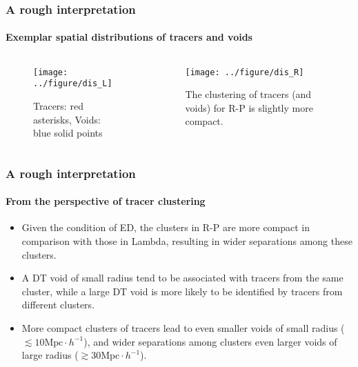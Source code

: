 \documentclass{beamer}
\newtheorem{Narrow down the analysis}{Narrow down the analysis}
\begin{document}
\begin{frame}
	\frametitle{A rough interpretation}
	\framesubtitle{Exemplar spatial distributions of tracers and voids}
	\begin{columns}
	\begin{column}{0.5\textwidth}
	\begin{figure}
\centering
\texttt{[image: ../figure/dis\_L]}
\caption{Tracers: red asterisks, Voids: blue solid points}
\label{29}
\end{figure}
	\end{column}
	\begin{column}{0.5\textwidth}
	\begin{figure}
\centering
\texttt{[image: ../figure/dis\_R]}
\caption{The clustering of tracers (and voids) for R-P is slightly more compact.}
\label{29}
\end{figure}
	\end{column}
	\end{columns}
\end{frame}

\begin{frame}
	\frametitle{A rough interpretation}
	\framesubtitle{From the perspective of tracer clustering}
	\begin{itemize}
	\pause \item Given the condition of ED, the clusters in R-P are more compact in comparison with those in Lambda, resulting in wider separations among these clusters.
	\pause \item A DT void of small radius tend to be associated with tracers from the same cluster, while a large DT void is more likely to be identified by tracers from different clusters.
    \pause \item More compact clusters of tracers lead to even smaller voids of small radius ($\lesssim 10\mathrm{Mpc}\cdot h^{-1}$), and wider separations among clusters even larger voids of large radius ($\gtrsim 30\mathrm{Mpc}\cdot h^{-1}$).
	\end{itemize}
\end{frame}
\end{document}
